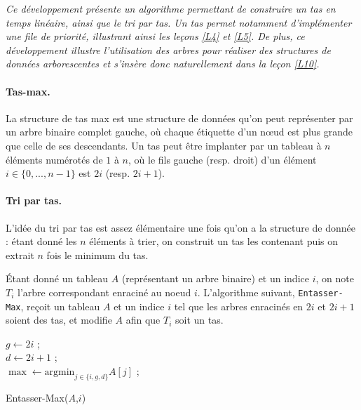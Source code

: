 

\textit{Ce développement présente un algorithme permettant de construire un tas en temps linéaire, ainsi que le tri par tas. Un tas permet notamment d'implémenter une file de priorité, illustrant ainsi les leçons \ref{L4} et \ref{L5}. De plus, ce développement illustre l'utilisation des arbres pour réaliser des structures de données arborescentes et s'insère donc naturellement dans la leçon \ref{L10}.}


\paragraph{Tas-max.} La structure de tas max est une structure de données qu'on peut représenter par un arbre binaire complet gauche, où chaque étiquette d'un nœud est plus grande que celle de ses descendants. Un tas peut être implanter par un tableau à $n$ éléments numérotés de $1$ à $n$, où le fils gauche (resp. droit) d'un élément $i \in \{0,...,n-1\}$ est $2i$  (resp. $2i+1$).

\paragraph{Tri par tas.}

L'idée du tri par tas est assez élémentaire une fois qu'on a la structure de donnée : étant donné les $n$ éléments à trier, on construit un tas les contenant puis on extrait $n$ fois le minimum du tas.\newline


Étant donné un tableau $A$ (représentant un arbre binaire) et un indice $i$, on note $T_i$ l'arbre correspondant enraciné au noeud $i$. L'algorithme suivant, {\tt Entasser-Max}, reçoit un tableau $A$ et un indice $i$ tel que les arbres enracinés en $2i$ et $2i+1$ soient des tas, et modifie $A$ afin que $T_i$ soit un tas.

\begin{algorithm}
$g \leftarrow 2i$ ;\\
$d \leftarrow 2i+1$ ;\\

$\max \leftarrow \text{argmin}_{j \in \{i,g,d \}} A[j]$ ;\\
\caption{Entasser-Max($A$,$i$)}
\end{algorithm}

